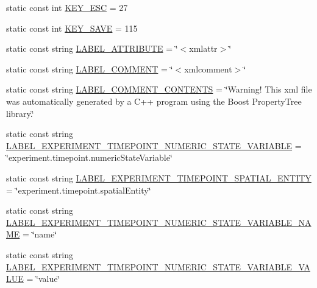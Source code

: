 \begin{DoxyCompactItemize}
\item 
static const int \hyperlink{classmultiscale_1_1analysis_1_1Detector_a0d1f2fd9eae1b166ac097668889c02aa}{K\-E\-Y\-\_\-\-E\-S\-C} = 27
\item 
static const int \hyperlink{classmultiscale_1_1analysis_1_1Detector_aa9acc60392e3eb0f0a9c3019c63301ae}{K\-E\-Y\-\_\-\-S\-A\-V\-E} = 115
\item 
static const string \hyperlink{classmultiscale_1_1analysis_1_1Detector_aa82a238495f03f285893ea3345437224}{L\-A\-B\-E\-L\-\_\-\-A\-T\-T\-R\-I\-B\-U\-T\-E} = \char`\"{}$<$xmlattr$>$\char`\"{}
\item 
static const string \hyperlink{classmultiscale_1_1analysis_1_1Detector_a561d5a58b94e4ccce28726c98f6ca71e}{L\-A\-B\-E\-L\-\_\-\-C\-O\-M\-M\-E\-N\-T} = \char`\"{}$<$xmlcomment$>$\char`\"{}
\item 
static const string \hyperlink{classmultiscale_1_1analysis_1_1Detector_adf6527cf12c5267d28210a0a60ce43cf}{L\-A\-B\-E\-L\-\_\-\-C\-O\-M\-M\-E\-N\-T\-\_\-\-C\-O\-N\-T\-E\-N\-T\-S} = \char`\"{}Warning! This xml file was automatically generated by a C++ program using the Boost Property\-Tree library.\char`\"{}
\item 
static const string \hyperlink{classmultiscale_1_1analysis_1_1Detector_ae56e690220d68c5961b210e49d90c6f0}{L\-A\-B\-E\-L\-\_\-\-E\-X\-P\-E\-R\-I\-M\-E\-N\-T\-\_\-\-T\-I\-M\-E\-P\-O\-I\-N\-T\-\_\-\-N\-U\-M\-E\-R\-I\-C\-\_\-\-S\-T\-A\-T\-E\-\_\-\-V\-A\-R\-I\-A\-B\-L\-E} = \char`\"{}experiment.\-timepoint.\-numeric\-State\-Variable\char`\"{}
\item 
static const string \hyperlink{classmultiscale_1_1analysis_1_1Detector_a8cade9693bb6ce63be30adebd318fd21}{L\-A\-B\-E\-L\-\_\-\-E\-X\-P\-E\-R\-I\-M\-E\-N\-T\-\_\-\-T\-I\-M\-E\-P\-O\-I\-N\-T\-\_\-\-S\-P\-A\-T\-I\-A\-L\-\_\-\-E\-N\-T\-I\-T\-Y} = \char`\"{}experiment.\-timepoint.\-spatial\-Entity\char`\"{}
\item 
static const string \hyperlink{classmultiscale_1_1analysis_1_1Detector_a66701b2cd4111a3fd8c6e0a9faafcbc1}{L\-A\-B\-E\-L\-\_\-\-E\-X\-P\-E\-R\-I\-M\-E\-N\-T\-\_\-\-T\-I\-M\-E\-P\-O\-I\-N\-T\-\_\-\-N\-U\-M\-E\-R\-I\-C\-\_\-\-S\-T\-A\-T\-E\-\_\-\-V\-A\-R\-I\-A\-B\-L\-E\-\_\-\-N\-A\-M\-E} = \char`\"{}name\char`\"{}
\item 
static const string \hyperlink{classmultiscale_1_1analysis_1_1Detector_a46e4fde2eefd347da05a8c28f55fea8a}{L\-A\-B\-E\-L\-\_\-\-E\-X\-P\-E\-R\-I\-M\-E\-N\-T\-\_\-\-T\-I\-M\-E\-P\-O\-I\-N\-T\-\_\-\-N\-U\-M\-E\-R\-I\-C\-\_\-\-S\-T\-A\-T\-E\-\_\-\-V\-A\-R\-I\-A\-B\-L\-E\-\_\-\-V\-A\-L\-U\-E} = \char`\"{}value\char`\"{}

\end{DoxyCompactItemize}
